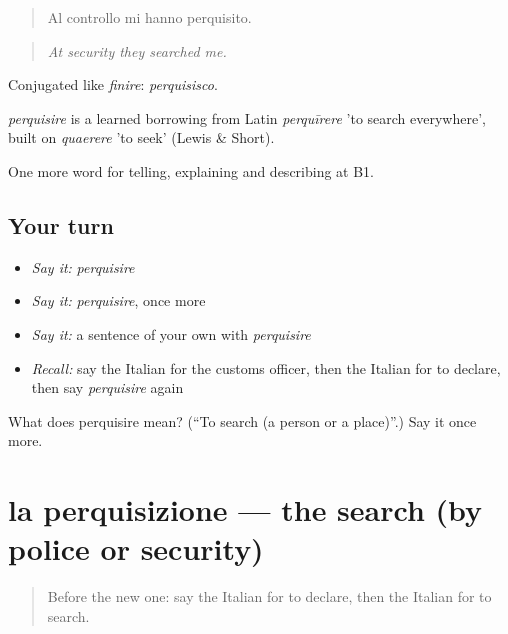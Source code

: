 \begin{quote}
Al controllo mi hanno perquisito.
\end{quote}

\begin{quote}
\emph{At security they searched me.}
\end{quote}

Conjugated like \emph{finire}: \emph{perquisisco}.

\begin{cousinweb}
\emph{perquisire} is a learned borrowing from Latin \emph{perquīrere} 'to search everywhere', built on \emph{quaerere} 'to seek' (Lewis \& Short).
\end{cousinweb}

\begin{grammarlens}[title={What you've built}]
One more word for telling, explaining and describing at B1.
\end{grammarlens}

\subsection*{Your turn}
\begin{itemize}
\raggedright
  \item \emph{Say it:} \emph{perquisire}
  \item \emph{Say it:} \emph{perquisire}, once more
  \item \emph{Say it:} a sentence of your own with \emph{perquisire}
  \item \emph{Recall:} say the Italian for the customs officer, then the Italian for to declare, then say \emph{perquisire} again
\end{itemize}

\begin{tcolorbox}[breakable,colback=teal!4,colframe=teal!35!black,title={Before you move on}]
What does perquisire mean? (\textquotedblleft{}To search (a person or a place)\textquotedblright{}.) Say it once more.
\end{tcolorbox}
\section[la perquisizione]{la perquisizione — the search (by police or security)}

\label{lesson:IT-C427-perquisizione}



\begin{quote}
Before the new one: say the Italian for to declare, then the Italian for to search.
\end{quote}

